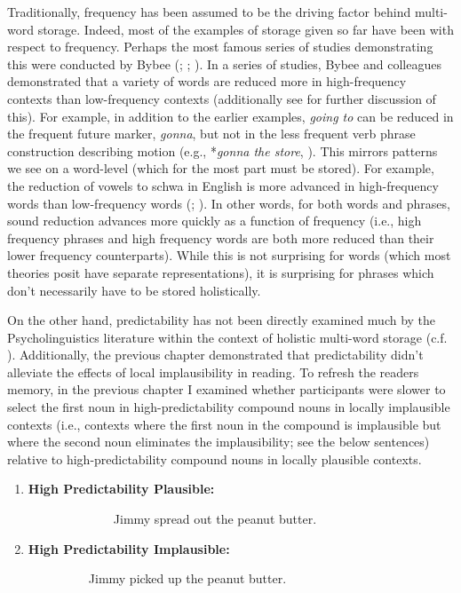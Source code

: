 \documentclass[
  12pt,
  letterpaper,
]{scrreprt}
\begin{document}
Traditionally, frequency has been assumed to be the driving factor
behind multi-word storage. Indeed, most of the examples of storage given
so far have been with respect to frequency. Perhaps the most famous
series of studies demonstrating this were conducted by Bybee
(; ; ). In a series of studies, Bybee and colleagues
demonstrated that a variety of words are reduced more in high-frequency
contexts than low-frequency contexts (additionally see
 for further discussion of this). For example, in addition to the
earlier examples, \emph{going to} can be reduced in the frequent future
marker, \emph{gonna}, but not in the less frequent verb phrase
construction describing motion (e.g., *\emph{gonna the store},
). This mirrors patterns we see on
a word-level (which for the most part must be stored). For example, the
reduction of vowels to schwa in English is more advanced in
high-frequency words than low-frequency words
(;
). In other
words, for both words and phrases, sound reduction advances more quickly
as a function of frequency (i.e., high frequency phrases and high
frequency words are both more reduced than their lower frequency
counterparts). While this is not surprising for words (which most
theories posit have separate representations), it is surprising for
phrases which don't necessarily have to be stored holistically.

On the other hand, predictability has not been directly examined much by
the Psycholinguistics literature within the context of holistic
multi-word storage (c.f.
). Additionally, the previous chapter demonstrated that
predictability didn't alleviate the effects of local implausibility in
reading. To refresh the readers memory, in the previous chapter I
examined whether participants were slower to select the first noun in
high-predictability compound nouns in locally implausible contexts
(i.e., contexts where the first noun in the compound is implausible but
where the second noun eliminates the implausibility; see the below
sentences) relative to high-predictability compound nouns in locally
plausible contexts.

\begin{enumerate}
\def\labelenumi{\arabic{enumi}.}
\item
  \begin{description}
  \item[\textbf{High Predictability Plausible:}]
  ~~~~~~~~Jimmy spread out the peanut butter.
  \end{description}
\item
  \begin{description}
  \item[\textbf{High Predictability Implausible:}]
  ~~~~Jimmy picked up the peanut butter.
  \end{description}
\end{enumerate}
\end{document}
